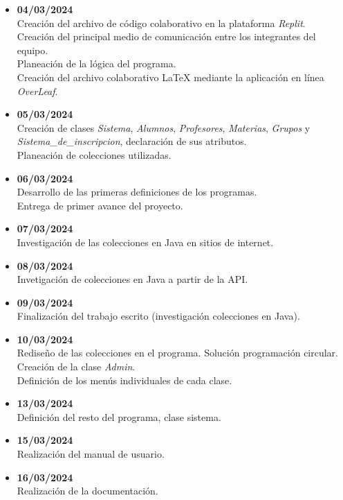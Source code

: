 \documentclass[a4paper,12pt]{article}
\begin{document}
\begin{itemize}
    \item \textbf{04/03/2024}\\Creación del archivo de código colaborativo en la plataforma \textit{Replit}.\\Creación del principal medio de comunicación entre los integrantes del equipo.\\Planeación de la lógica del programa.\\Creación del archivo colaborativo {\LaTeX} mediante la aplicación en línea \textit{OverLeaf}.
    \item \textbf{05/03/2024}\\Creación de clases \textit{Sistema}, \textit{Alumnos}, \textit{Profesores}, \textit{Materias}, \textit{Grupos} y \textit{Sistema\_de\_inscripcion}, declaración de sus atributos.\\Planeación de colecciones utilizadas.
    \item \textbf{06/03/2024}\\Desarrollo de las primeras definiciones de los programas.\\Entrega de primer avance del proyecto.
    \item \textbf{07/03/2024}\\Investigación de las colecciones en Java en sitios de internet.
    \item \textbf{08/03/2024}\\Invetigación de colecciones en Java a partir de la API.
    \item \textbf{09/03/2024}\\Finalización del trabajo escrito (investigación colecciones en Java).
    \item \textbf{10/03/2024}\\Rediseño de las colecciones en el programa. Solución programación circular.\\Creación de la clase \textit{Admin}.\\Definición de los menús individuales de cada clase.
    \item \textbf{13/03/2024}\\Definición del resto del programa, clase sistema.
    \item \textbf{15/03/2024}\\Realización del manual de usuario.
    \item \textbf{16/03/2024}\\Realización de la documentación.
\end{itemize}
    
\end{document}
